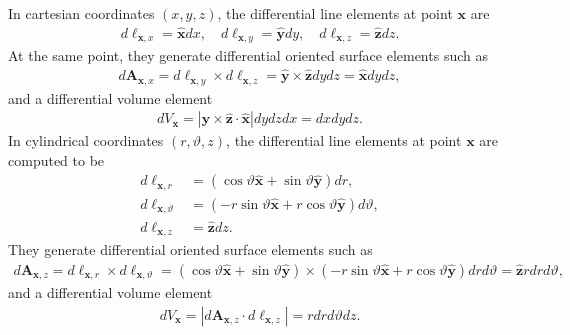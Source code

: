 \begin{example}
    In cartesian coordinates $(x,y,z)$, the differential line elements at point $\bm{x}$ are
    \begin{align*}
        d\bm{\ell}_{\bm{x},x}=\bm{\hat{x}}dx, \quad d\bm{\ell}_{\bm{x},y}=\bm{\hat{y}}dy, \quad d\bm{\ell}_{\bm{x},z}=\bm{\hat{z}}dz.
    \end{align*}
    At the same point, they generate differential oriented surface elements such as
    \begin{align*}
        d\bm{A}_{\bm{x},x}=d\bm{\ell}_{\bm{x},y}\times d\bm{\ell}_{\bm{x},z}=\bm{\hat{y}}\times\bm{\hat{z}}dydz=\bm{\hat{x}}dydz,
    \end{align*}
    and a differential volume element
    \begin{align*}
        dV_{\bm{x}}=|\bm{\hat{y}}\times\bm{\hat{z}}\cdot\bm{\hat{x}}|dydzdx=dxdydz.
    \end{align*}
    In cylindrical coordinates $(r,\vartheta,z)$, the differential line elements at point $\bm{x}$ are computed to be
    \begin{align*}
        d\bm{\ell}_{\bm{x},r}&=(\cos\vartheta\bm{\hat{x}}+\sin\vartheta\bm{\hat{y}})dr,\\
        d\bm{\ell}_{\bm{x},\vartheta}&=(-r\sin\vartheta\bm{\hat{x}}+r\cos\vartheta\bm{\hat{y}})d\vartheta,\\
        d\bm{\ell}_{\bm{x},z}&=\bm{\hat{z}}dz.
    \end{align*}
    They generate differential oriented surface elements such as
    \begin{align*}
        d\bm{A}_{\bm{x},z}=d\bm{\ell}_{\bm{x},r}\times d\bm{\ell}_{\bm{x},\vartheta}=(\cos\vartheta\bm{\hat{x}}+\sin\vartheta\bm{\hat{y}})\times (-r\sin\vartheta\bm{\hat{x}}+r\cos\vartheta\bm{\hat{y}})drd\vartheta=\bm{\hat{z}}rdrd\vartheta,
    \end{align*}
    and a differential volume element 
    \begin{align*}
        dV_{\bm{x}}=|d\bm{A}_{\bm{x},z}\cdot d\bm{\ell}_{\bm{x},z}|=rdrd\vartheta dz.
    \end{align*}
\end{example}

